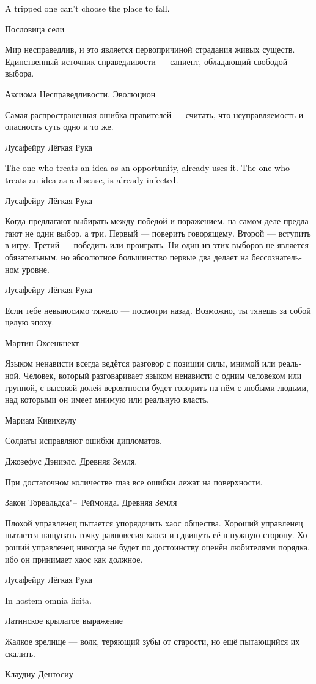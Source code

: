 \documentclass[a4paper,12pt,fleqn]{book}\usepackage{cooltooltips}\usepackage{polyglossia}\setdefaultlanguage[babelshorthands=true]{russian}\setotherlanguage{english}\defaultfontfeatures{Ligatures=TeX,Mapping=tex-text} \usepackage{xcolor}\definecolor{lightgray}{HTML}{bbbbbb}\color{lightgray}\newcommand{\ml}[3]{\textenglish{\textcolor{black}{#3}}}
\begin{document}
{\epigraph{
\ml{$0$}
{Оступившийся не выбирает, куда упасть.}
{A tripped one can't choose the place to fall.}
}{Пословица сели}

\epigraph
{Мир несправедлив, и это является первопричиной страдания живых существ.
Единственный источник справедливости --- сапиент, обладающий свободой выбора.}
{Аксиома Несправедливости. Эволюцион}

\epigraph
{Самая распространенная ошибка правителей --- считать, что неуправляемость и опасность суть одно и то же.}
{Лусафейру Лёгкая Рука}

\epigraph{
\ml{$0$}
{Тот, кто считает идею возможностью, уже её использует.}
{The one who treats an idea as an opportunity, already uses it.}
\ml{$0$}
{Тот, кто считает идею болезнью, уже ею заражён.}
{The one who treats an idea as a disease, is already infected.}
}{Лусафейру Лёгкая Рука}

\epigraph
{Когда предлагают выбирать между победой и поражением, на самом деле предлагают не один выбор, а три.
Первый --- поверить говорящему.
Второй --- вступить в игру.
Третий --- победить или проиграть.
Ни один из этих выборов не является обязательным, но абсолютное большинство первые два делает на бессознательном уровне.}
{Лусафейру Лёгкая Рука}

\epigraph
{Если тебе невыносимо тяжело --- посмотри назад.
Возможно, ты тянешь за собой целую эпоху.}
{Мартин Охсенкнехт}

\epigraph
{Языком ненависти всегда ведётся разговор с позиции силы, мнимой или реальной.
Человек, который разговаривает языком ненависти с одним человеком или группой, с высокой долей вероятности будет говорить на нём с любыми людьми, над которыми он имеет мнимую или реальную власть.}
{Мариам Кивихеулу}

\epigraph
{Солдаты исправляют ошибки дипломатов.}
{Джозефус Дэниэлс, Древняя Земля.}

\epigraph
{При достаточном количестве глаз все ошибки лежат на поверхности.}
{Закон Торвальдса"--~Реймонда. Древняя Земля}

\epigraph
{Плохой управленец пытается упорядочить хаос общества.
Хороший управленец пытается нащупать точку равновесия хаоса и сдвинуть её в нужную сторону.
Хороший управленец никогда не будет по достоинству оценён любителями порядка, ибо он принимает хаос как должное.}
{Лусафейру Лёгкая Рука}

\epigraph
{In hostem omnia licita.}
{Латинское крылатое выражение}

\epigraph
{Жалкое зрелище --- волк, теряющий зубы от старости, но ещё пытающийся их скалить.}
{Клаудиу Дентосиу}

}
\end{document}
